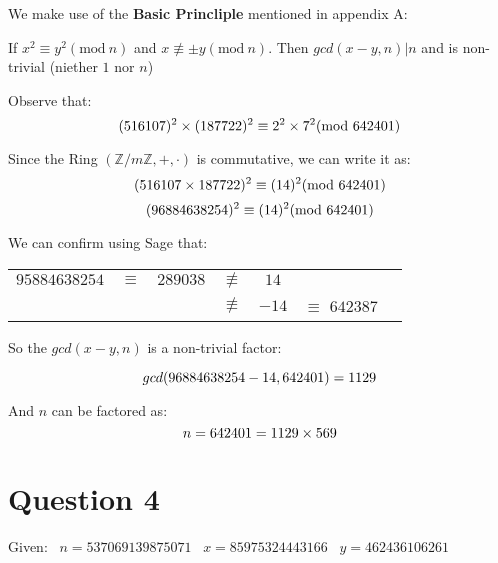 \documentclass{article}
\numberwithin{equation}{subsection}
\begin{document}
\vspace{10pt}
We make use of the \textbf{Basic Princliple} mentioned in appendix A:
\begin{adjustwidth}{2em}{2em}	
If $x^2 \equiv y^2 (\textrm{mod}\ n)$ and $x \not \equiv \pm y (\textrm{mod}\ n)$. Then $gcd(x-y, n) | n$ and is non-trivial (niether $1$ nor $n$) 
\end{adjustwidth}

\vspace{10pt}
Observe that:
\begin{equation}\notag
	(516107)^2 \times (187722)^2 \equiv 2^2 \times 7^2 (\textrm{mod} \ 642401)	
\end{equation}

Since the Ring $(\mathbb{Z}/m\mathbb{Z}, + , \cdot)$ is commutative, we can write it as:
\begin{equation}\notag
	(516107 \times 187722)^2 \equiv (14)^2 (\textrm{mod}\ 642401)	
\end{equation}
\begin{equation}\notag
	(96884638254)^2 \equiv (14)^2 (\textrm{mod}\ 642401)	
\end{equation}


We can confirm using Sage that:

\begin{tabular}{c c c c c c c}
	$95884638254$	&	$\equiv$	&	$289038$	&	$\not \equiv$	&	$14$	&\\
								&						&						&	$\not \equiv$	&	$-14$	& $\equiv$ $642387$
\end{tabular}


So the $gcd(x-y, n)$ is a non-trivial factor:

\begin{equation}\notag
	gcd(96884638254-14, 642401) = 1129	
\end{equation}

And $n$ can be factored as:
\begin{equation}\notag
	n = 642401 = 1129 \times 569	
\end{equation}

\newpage
	\thispagestyle{fancy}


	\section*{Question 4}

	Given: \ $n=537069139875071$ \ $x=85975324443166$ \ $y=462436106261$
\end{document}
